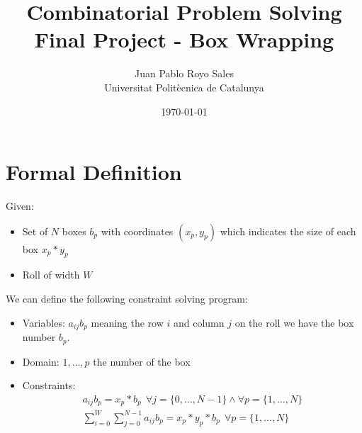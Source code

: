 \documentclass[12pt, a4paper]{article}
\title{%
      Combinatorial Problem Solving \\
      Final Project - Box Wrapping
}
\author{%
  Juan Pablo Royo Sales \\
  \small{Universitat Politècnica de Catalunya}
}
\date\today
\begin{document}
\maketitle

\section{Formal Definition}
Given:


\begin{itemize}
  \item Set of $N$ boxes $b_p$ with coordinates $(x_p, y_p)$ which indicates the size of each box $x_p * y_p$
  \item Roll of width $W$
\end{itemize}

We can define the following constraint solving program:

\begin{itemize}
  \item Variables: $a_{ij}b_p$ meaning the row $i$ and column $j$ on the roll we have the box number $b_p$.
  \item Domain: ${1,\dots,p}$ the number of the box
  \item Constraints:
    \begin{subequations}
      \begin{align}
        a_{ij}b_p = x_p * b_p \ \ \forall j=\{0,\dots,N-1\} \land \forall p=\{1,\dots,N\} \\
        \sum_{i=0}^W\sum_{j=0}^{N-1} a_{ij}b_p = x_p * y_p * b_p \ \ \forall p=\{1,\dots,N\}
    \end{align}
    \end{subequations}
\end{itemize}
\end{document}
